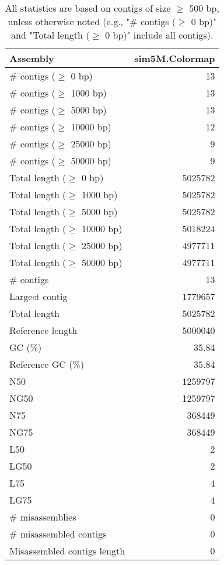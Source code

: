 \documentclass[12pt,a4paper]{article}
\begin{document}
\begin{table}[ht]
\begin{center}
\caption{All statistics are based on contigs of size $\geq$ 500 bp, unless otherwise noted (e.g., "\# contigs ($\geq$ 0 bp)" and "Total length ($\geq$ 0 bp)" include all contigs).}
\begin{tabular}{|l*{1}{|r}|}
\hline
Assembly & sim5M.Colormap \\ \hline
\# contigs ($\geq$ 0 bp) & 13 \\ \hline
\# contigs ($\geq$ 1000 bp) & 13 \\ \hline
\# contigs ($\geq$ 5000 bp) & 13 \\ \hline
\# contigs ($\geq$ 10000 bp) & 12 \\ \hline
\# contigs ($\geq$ 25000 bp) & 9 \\ \hline
\# contigs ($\geq$ 50000 bp) & 9 \\ \hline
Total length ($\geq$ 0 bp) & 5025782 \\ \hline
Total length ($\geq$ 1000 bp) & 5025782 \\ \hline
Total length ($\geq$ 5000 bp) & 5025782 \\ \hline
Total length ($\geq$ 10000 bp) & 5018224 \\ \hline
Total length ($\geq$ 25000 bp) & 4977711 \\ \hline
Total length ($\geq$ 50000 bp) & 4977711 \\ \hline
\# contigs & 13 \\ \hline
Largest contig & 1779657 \\ \hline
Total length & 5025782 \\ \hline
Reference length & 5000040 \\ \hline
GC (\%) & 35.84 \\ \hline
Reference GC (\%) & 35.84 \\ \hline
N50 & 1259797 \\ \hline
NG50 & 1259797 \\ \hline
N75 & 368449 \\ \hline
NG75 & 368449 \\ \hline
L50 & 2 \\ \hline
LG50 & 2 \\ \hline
L75 & 4 \\ \hline
LG75 & 4 \\ \hline
\# misassemblies & 0 \\ \hline
\# misassembled contigs & 0 \\ \hline
Misassembled contigs length & 0 \\ \hline

\end{tabular}
\end{center}
\end{table}
\end{document}
